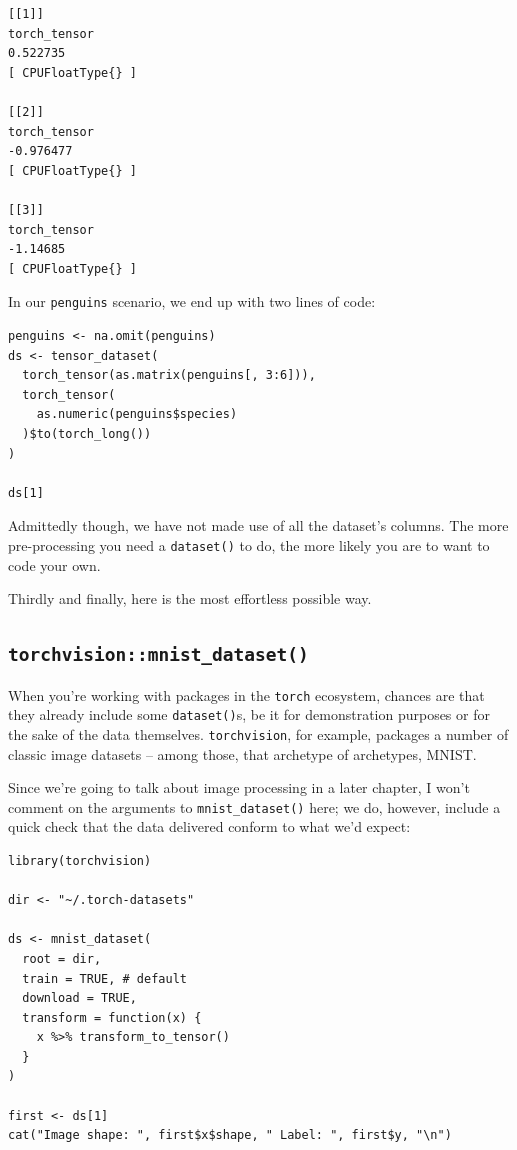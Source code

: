 \documentclass[
  letterpaper,
]{krantz}
\begin{document}
\begin{verbatim}
[[1]]
torch_tensor
0.522735
[ CPUFloatType{} ]

[[2]]
torch_tensor
-0.976477
[ CPUFloatType{} ]

[[3]]
torch_tensor
-1.14685
[ CPUFloatType{} ]
\end{verbatim}

In our \texttt{penguins} scenario, we end up with two lines of code:

\begin{verbatim}
penguins <- na.omit(penguins)
ds <- tensor_dataset(
  torch_tensor(as.matrix(penguins[, 3:6])),
  torch_tensor(
    as.numeric(penguins$species)
  )$to(torch_long())
)

ds[1]
\end{verbatim}

Admittedly though, we have not made use of all the dataset's columns.
The more pre-processing you need a \texttt{dataset()} to do, the more
likely you are to want to code your own.

Thirdly and finally, here is the most effortless possible way.

\hypertarget{torchvisionmnist_dataset}{%
\subsection{\texorpdfstring{\texttt{torchvision::mnist\_dataset()}}{torchvision::mnist\_dataset()}}\label{torchvisionmnist_dataset}}

When you're working with packages in the \texttt{torch} ecosystem,
chances are that they already include some \texttt{dataset()}s, be it
for demonstration purposes or for the sake of the data themselves.
\texttt{torchvision}, for example, packages a number of classic image
datasets -- among those, that archetype of archetypes, MNIST.

Since we're going to talk about image processing in a later chapter, I
won't comment on the arguments to \texttt{mnist\_dataset()} here; we do,
however, include a quick check that the data delivered conform to what
we'd expect:

\begin{verbatim}
library(torchvision)

dir <- "~/.torch-datasets"

ds <- mnist_dataset(
  root = dir,
  train = TRUE, # default
  download = TRUE,
  transform = function(x) {
    x %>% transform_to_tensor() 
  }
)

first <- ds[1]
cat("Image shape: ", first$x$shape, " Label: ", first$y, "\n")
\end{verbatim}
\end{document}
